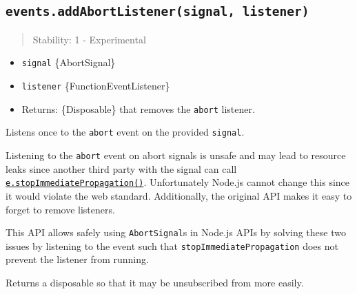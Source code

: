 \subsection{\texorpdfstring{\texttt{events.addAbortListener(signal,\ listener)}}{events.addAbortListener(signal, listener)}}\label{events.addabortlistenersignal-listener}

\begin{quote}
Stability: 1 - Experimental
\end{quote}

\begin{itemize}
\tightlist
\item
  \texttt{signal} \{AbortSignal\}
\item
  \texttt{listener} \{Function\textbar EventListener\}
\item
  Returns: \{Disposable\} that removes the \texttt{abort} listener.
\end{itemize}

Listens once to the \texttt{abort} event on the provided
\texttt{signal}.

Listening to the \texttt{abort} event on abort signals is unsafe and may
lead to resource leaks since another third party with the signal can
call
\hyperref[eventstopimmediatepropagation]{\texttt{e.stopImmediatePropagation()}}.
Unfortunately Node.js cannot change this since it would violate the web
standard. Additionally, the original API makes it easy to forget to
remove listeners.

This API allows safely using \texttt{AbortSignal}s in Node.js APIs by
solving these two issues by listening to the event such that
\texttt{stopImmediatePropagation} does not prevent the listener from
running.

Returns a disposable so that it may be unsubscribed from more easily.

\begin{Shaded}
\begin{Highlighting}[]
\OperatorTok{=} \NormalTok{(}\NormalTok{)}\OperatorTok{;}

 
  \OperatorTok{;}
  \NormalTok{ \{}
\NormalTok{(}\OperatorTok{,}\KeywordTok{=\textgreater{}}\NormalTok{())}\OperatorTok{;}
\OperatorTok{=} \OperatorTok{,}\KeywordTok{=\textgreater{}}\NormalTok{ \{}
\NormalTok{    \})}\OperatorTok{;}
\NormalTok{  \} }\NormalTok{ \{}
\NormalTok{[}\NormalTok{]()}\OperatorTok{;}
\NormalTok{  \}}
\NormalTok{\}}
\end{Highlighting}
\end{Shaded}

